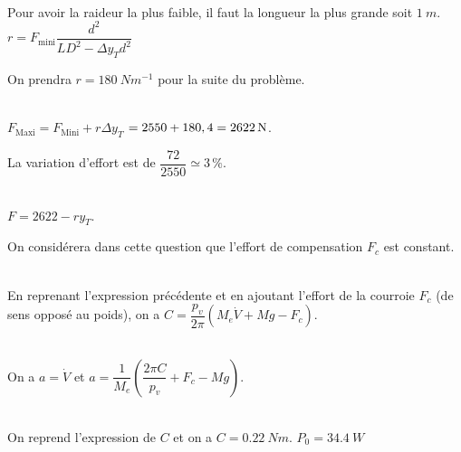 \ifprof
\begin{corrige}~\\
Pour avoir la raideur la plus faible, il faut la longueur la plus grande soit $\SI{1}{m}$.
$r =F_{\text{mini}}\dfrac{ d^2}{ L D^2-\Delta y_T d^2}$ 
\end{corrige}
\else
\fi

On prendra $r=\SI{180}{Nm^{-1}}$ pour la suite du problème.

\ifprof
\begin{corrige}~\\
$F_{\text{Maxi}}  =F_{\text{Mini}}+r\Delta y_T$ $=2550+180\time 0,4 = \SI{2622}{N}$.

La variation d'effort est de $\dfrac{72}{2550}\simeq 3\,\%$. 
\end{corrige}
\else
\fi

\ifprof
\begin{corrige}~\\
$F=2622-r y_T$.
\end{corrige}
\else
\fi

On considérera dans cette question que l’effort de compensation $F_c$ est constant.

\ifprof
\begin{corrige}~\\
En reprenant l'expression précédente et en ajoutant l'effort de la courroie $F_c$ (de sens opposé au poids), on a 
$C = \dfrac{p_v}{2\pi}\left(M_e \dot{V} +Mg-F_c\right) $.
\end{corrige}
\else
\fi

\ifprof
\begin{corrige}~\\
On a $a=\dot{V}$ et $a=\dfrac{1}{M_e}\left( \dfrac{2\pi C}{p_v}+F_c-Mg \right)$.
\end{corrige}
\else
\fi

\ifprof
\begin{corrige}~\\
On reprend l'expression de $C$ et on a $C=\SI{0,22}{Nm}$.
$P_0=\SI{34,4}{W}$
\end{corrige}
\else
\fi

